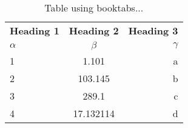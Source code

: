 \documentclass[a4paper,12pt]{article}
\begin{document}

\begin{table}[h!]
\begin{center}
\caption{Table using booktabs...}
\label{tab:table1}
\begin{tabular}{|l|c|r|}

\toprule

\textbf{Heading 1} & \textbf{Heading 2} & \textbf{Heading 3}\\
$\alpha$&$\beta$&$\gamma$\\

\midrule

1 & 1.101 & a\\
2 & 103.145 &b\\
3 & 289.1 & c\\
4 & 17.132114 &d\\

\bottomrule

\end{tabular}


\end{center}

\end{table}
\end{document}
